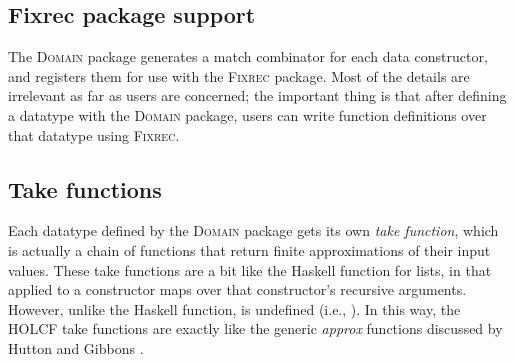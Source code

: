 \subsection{Fixrec package support}

The \textsc{Domain} package generates a match combinator for each data constructor, and registers them for use with the \textsc{Fixrec} package. Most of the details are irrelevant as far as users are concerned; the important thing is that after defining a datatype with the \textsc{Domain} package, users can write function definitions over that datatype using \textsc{Fixrec}.

\subsection{Take functions}

Each datatype defined by the \textsc{Domain} package gets its own \emph{take function}, which is actually a chain of functions that return finite approximations of their input values. These take functions are a bit like the Haskell function  for lists, in that  applied to a constructor maps  over that constructor's recursive arguments. However, unlike the Haskell  function,  is undefined (i.e., ). In this way, the HOLCF take functions are exactly like the generic \emph{approx} functions discussed by Hutton and Gibbons \cite{Hutton01}.

